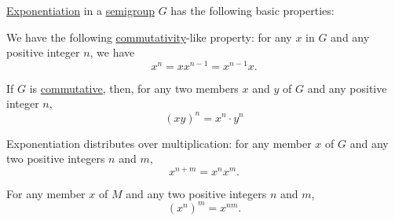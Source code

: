 \begin{proposition}\label{thm:semigroup_exponentiation_properties}
  \hyperref[def:semigroup/exponentiation]{Exponentiation} in a \hyperref[def:semigroup]{semigroup} \( G \) has the following basic properties:

  \begin{thmenum}
     We have the following \hyperref[def:binary_operation/commutative]{commutativity}-like property: for any \( x \) in \( G \) and any positive integer \( n \), we have
    \begin{equation}\label{eq:thm:semigroup_exponentiation_properties/commutativity}
      x^n = x x^{n-1} = x^{n-1} x.
    \end{equation}

     If \( G \) is \hyperref[def:semiring/commutative]{commutative}, then, for any two members \( x \) and \( y \) of \( G \) and any positive integer \( n \),
    \begin{equation}\label{eq:thm:semigroup_exponentiation_properties/multiplication}
      (xy)^n = x^n \cdot y^n
    \end{equation}

     Exponentiation distributes over multiplication: for any member \( x \) of \( G \) and any two positive integers \( n \) and \( m \),
    \begin{equation}\label{eq:thm:semigroup_exponentiation_properties/distributive}
      x^{n + m} = x^n x^m.
    \end{equation}

     For any member \( x \) of \( M \) and any two positive integers \( n \) and \( m \),
    \begin{equation}\label{eq:thm:semigroup_exponentiation_properties/repeated}
      (x^n)^m = x^{nm}.
    \end{equation}
  \end{thmenum}
\end{proposition}
